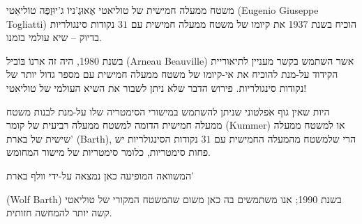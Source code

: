 \begin{surferPage}{משטח ממעלה חמישית של טוליאטי}
    אֶאוּגֶ'ניוֹ ג'יוּזֶפֶּה טוֹליאַטי
     \textenglish{(Eugenio Giuseppe Togliatti)}
      הוכיח בשנת 1937 את קיומו של משטח ממעלה חמישית עם $31$ נקודות סינגולריות בדיוק – שיא עולמי בזמנו.


    בשנת 1980, היה זה ארנוֹ בּוֹביל 
   \textenglish{(Arneau Beauville)} אשר השתמש בקשר מעניין לתיאוריית
    הקידוד על-מנת להוכיח את אי-קיומו של משטח ממעלה חמישית עם מספר גדול יותר של
    נקודות סינגולריות. 
    פירוש הדבר שלא ניתן לשבור את השיא העולמי של טוליאטי!

    היות שאין גוף אפלטוני שניתן להשתמש במישורי הסימטריה שלו על-מנת
    לבנות משטח ממעלה חמישית הדומה למשטח ממעלה רביעית של קומר (Kummer)
    או למשטח ממעלה שישית של בארת'
     \textenglish{(Barth)}, הרי שלמשטח מהמעלה החמישית עם $31$ נקודות הסינגולריות יש פחות סימטריות,
    כלומר סימטריות של מישור המחומש.

 המשוואה המופיעה כאן נמצאה על-ידי וולף בארת'
  
  \textenglish{(Wolf Barth)}
   בשנת 1990; אנו משתמשים בה כאן
משום שהמשטח המקורי של טוליאטי קשה יותר להמחשה חזותית.
\end{surferPage}
